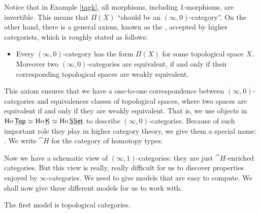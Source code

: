 Notice that in Example \ref{tagk}, all morphisms, including 1-morphisms, are invertible. This means that $\Pi(X)$ ``should be
an $(\infty,0)$-category''. On the other hand, there is a general axiom, known as the ,
accepted by higher categorists, which is roughly stated as follows:

\begin{itemize}
    \item Every $(\infty,0)$-category has the form $\Pi(X)$ for some topological space $X$. Moreover two $(\infty,0)$-categories 
    are equivalent, if and only if their corresponding topological spaces are weakly equivalent.
\end{itemize}

This axiom ensures that we have a one-to-one correspondence between $(\infty,0)$-categories and equivalences classes of topological spaces,
where two spaces are equivalent if and only if they are weakly equivalent. That is, we use objects 
in $\operatorname{Ho}\underline{\smash{\mathsf{Top}}}\simeq\operatorname{Ho}\underline{\smash{\mathsf{K}}}\simeq\operatorname{Ho}\underline{\smash{\mathsf{SSet}}}$ to describe $(\infty,0)$-categories. Because of such important role they play in
higher category theory, we give them a special name: . We write $\cat{H}$ for the category of homotopy types.

Now we have a schematic view of $(\infty,1)$-categories: they are just $\cat{H}$-enriched categories. But this view is really, really difficult
for us to discover properties enjoyed by $\infty$-categories. We need to give models that are easy to compute. We shall now give three 
different models for us to work with.


The first model is topological categories. 


